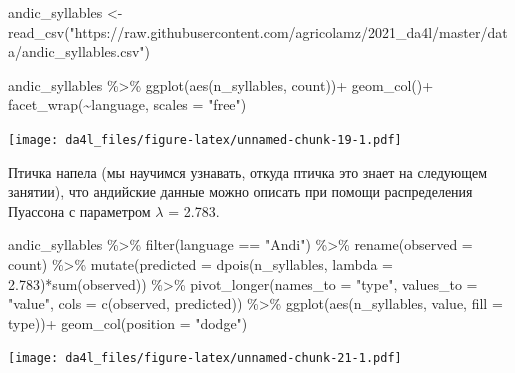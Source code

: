 \documentclass[
]{book}
\newenvironment{Shaded}{\begin{snugshade}}{\end{snugshade}}
\newcommand{\AttributeTok}[1]{\textcolor[rgb]{0.77,0.63,0.00}{#1}}
\newcommand{\FloatTok}[1]{\textcolor[rgb]{0.00,0.00,0.81}{#1}}
\newcommand{\FunctionTok}[1]{\textcolor[rgb]{0.00,0.00,0.00}{#1}}
\newcommand{\NormalTok}[1]{#1}
\newcommand{\OtherTok}[1]{\textcolor[rgb]{0.56,0.35,0.01}{#1}}
\newcommand{\SpecialCharTok}[1]{\textcolor[rgb]{0.00,0.00,0.00}{#1}}
\newcommand{\StringTok}[1]{\textcolor[rgb]{0.31,0.60,0.02}{#1}}
\begin{document}
\begin{Shaded}
\begin{Highlighting}[]
\NormalTok{andic\_syllables }\OtherTok{\textless{}{-}} \FunctionTok{read\_csv}\NormalTok{(}\StringTok{"https://raw.githubusercontent.com/agricolamz/2021\_da4l/master/data/andic\_syllables.csv"}\NormalTok{) }

\NormalTok{andic\_syllables }\SpecialCharTok{\%\textgreater{}\%} 
  \FunctionTok{ggplot}\NormalTok{(}\FunctionTok{aes}\NormalTok{(n\_syllables, count))}\SpecialCharTok{+}
  \FunctionTok{geom\_col}\NormalTok{()}\SpecialCharTok{+}
  \FunctionTok{facet\_wrap}\NormalTok{(}\SpecialCharTok{\textasciitilde{}}\NormalTok{language, }\AttributeTok{scales =} \StringTok{"free"}\NormalTok{)}
\end{Highlighting}
\end{Shaded}

\texttt{[image: da4l\_files/figure-latex/unnamed-chunk-19-1.pdf]}

Птичка напела (мы научимся узнавать, откуда птичка это знает на следующем занятии), что андийские данные можно описать при помощи распределения Пуассона с параметром \(\lambda\) = 2.783.

\begin{Shaded}
\begin{Highlighting}[]
\NormalTok{andic\_syllables }\SpecialCharTok{\%\textgreater{}\%} 
  \FunctionTok{filter}\NormalTok{(language }\SpecialCharTok{==} \StringTok{"Andi"}\NormalTok{) }\SpecialCharTok{\%\textgreater{}\%} 
  \FunctionTok{rename}\NormalTok{(}\AttributeTok{observed =}\NormalTok{ count) }\SpecialCharTok{\%\textgreater{}\%} 
  \FunctionTok{mutate}\NormalTok{(}\AttributeTok{predicted =} \FunctionTok{dpois}\NormalTok{(n\_syllables, }\AttributeTok{lambda =} \FloatTok{2.783}\NormalTok{)}\SpecialCharTok{*}\FunctionTok{sum}\NormalTok{(observed)) }\SpecialCharTok{\%\textgreater{}\%} 
  \FunctionTok{pivot\_longer}\NormalTok{(}\AttributeTok{names\_to =} \StringTok{"type"}\NormalTok{, }\AttributeTok{values\_to =} \StringTok{"value"}\NormalTok{, }\AttributeTok{cols =} \FunctionTok{c}\NormalTok{(observed, predicted)) }\SpecialCharTok{\%\textgreater{}\%} 
  \FunctionTok{ggplot}\NormalTok{(}\FunctionTok{aes}\NormalTok{(n\_syllables, value, }\AttributeTok{fill =}\NormalTok{ type))}\SpecialCharTok{+}
  \FunctionTok{geom\_col}\NormalTok{(}\AttributeTok{position =} \StringTok{"dodge"}\NormalTok{)}
\end{Highlighting}
\end{Shaded}

\texttt{[image: da4l\_files/figure-latex/unnamed-chunk-21-1.pdf]}
\end{document}
